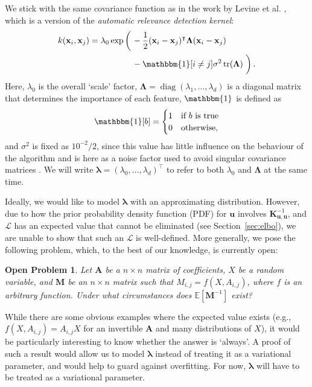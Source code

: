 \documentclass{mpaper}
\newtheorem{problem}[theorem]{Open Problem}
\DeclareMathOperator{\diag}{diag}
\DeclareMathOperator{\tr}{tr}
\newcommand{\Kuu}{\mathbf{K}_{\mathbf{u},\mathbf{u}}}
\begin{document}
We stick with the same covariance function as in the work by Levine et al.
\cite{DBLP:conf/nips/LevinePK11}, which is a version of the \emph{automatic
  relevance detection kernel}:
\begin{align*}
  k(\mathbf{x}_i, \mathbf{x}_j) = \lambda_0\exp\left( \vphantom{\frac{1}{2}} \right. &-\frac{1}{2}(\mathbf{x}_i - \mathbf{x}_j)^\intercal\bm\Lambda(\mathbf{x}_i - \mathbf{x}_j) \\
                                                                                     &- \mathbbm{1}[i \ne j]\sigma^2\tr(\bm\Lambda) \left. \vphantom{\frac{1}{2}} \right).
\end{align*}
Here, $\lambda_0$ is the overall `scale' factor, $\bm\Lambda = \diag(\lambda_1,
\dots, \lambda_d)$ is a diagonal matrix that determines the importance of each
feature, $\mathbbm{1}$ is defined as
\[
  \mathbbm{1}[b] = \begin{cases}
    1 & \mbox{if $b$ is true} \\
    0 & \mbox{otherwise},
  \end{cases}
\]
and $\sigma^2$ is fixed as $10^{-2}/2$, since this value has little influence on
the behaviour of the algorithm and is here as a noise factor used to avoid
singular covariance matrices \cite{DBLP:conf/nips/LevinePK11}. We will write
$\bm\lambda = (\lambda_0, \dots, \lambda_d)^\intercal$ to refer to both
$\lambda_0$ and $\bm\Lambda$ at the same time.

Ideally, we would like to model $\bm\lambda$ with an approximating distribution.
However, due to how the prior probability density function (PDF) for
$\mathbf{u}$ involves $\Kuu^{-1}$, and $\mathcal{L}$ has an expected value that
cannot be eliminated (see Section~\ref{sec:elbo}), we are unable to show that
such an $\mathcal{L}$ is well-defined. More generally, we pose the following
problem, which, to the best of our knowledge, is currently open:
\begin{problem}
  Let $\mathbf{A}$ be a $n \times n$ matrix of coefficients, $X$ be a random
  variable, and $\mathbf{M}$ be an $n \times n$ matrix such that $M_{i,j} = f(X,
  A_{i,j})$, where $f$ is an arbitrary function. Under what circumstances does
  $\mathbb{E}[\mathbf{M}^{-1}]$ exist?
\end{problem}
While there are some obvious examples where the expected value exists (e.g.,
$f(X, A_{i,j}) = A_{i,j}X$ for an invertible $\mathbf{A}$ and many distributions
of $X$), it would be particularly interesting to know whether the answer is
`always'. A proof of such a result would allow us to model $\bm\lambda$ instead
of treating it as a variational parameter, and would help to guard against
overfitting. For now, $\bm\lambda$ will have to be treated as a variational
parameter.
\end{document}
